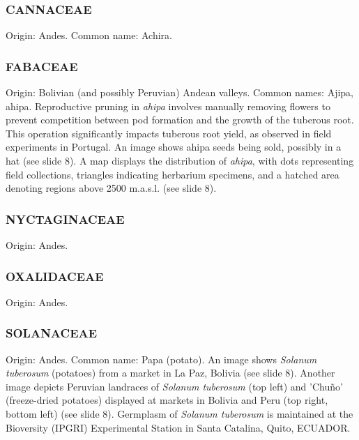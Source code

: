 \subsubsection{CANNACEAE} 
Origin: Andes. Common name: Achira.

\subsubsection{FABACEAE} 
Origin: Bolivian (and possibly Peruvian) Andean valleys. Common names: Ajipa, ahipa. Reproductive pruning in \textit{ahipa} involves manually removing flowers to prevent competition between pod formation and the growth of the tuberous root. This operation significantly impacts tuberous root yield, as observed in field experiments in Portugal. An image shows ahipa seeds being sold, possibly in a hat (see slide 8). A map displays the distribution of \textit{ahipa}, with dots representing field collections, triangles indicating herbarium specimens, and a hatched area denoting regions above 2500 m.a.s.l. (see slide 8).

\subsubsection{NYCTAGINACEAE} 
Origin: Andes.

\subsubsection{OXALIDACEAE} 
Origin: Andes.

\subsubsection{SOLANACEAE} 
Origin: Andes. Common name: Papa (potato). An image shows \textit{Solanum tuberosum} (potatoes) from a market in La Paz, Bolivia (see slide 8). Another image depicts Peruvian landraces of \textit{Solanum tuberosum} (top left) and 'Chuño' (freeze-dried potatoes) displayed at markets in Bolivia and Peru (top right, bottom left) (see slide 8). Germplasm of \textit{Solanum tuberosum} is maintained at the Bioversity (IPGRI) Experimental Station in Santa Catalina, Quito, ECUADOR.

